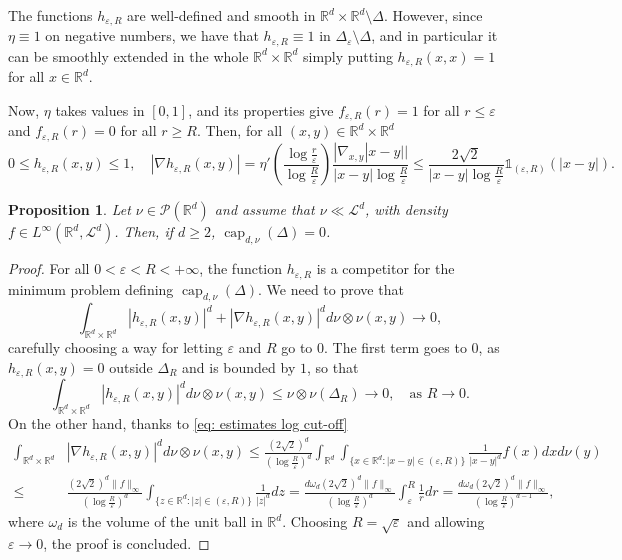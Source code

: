 \documentclass[10pt,leqno]{amsart}
\numberwithin{equation}{section}
\newtheorem{prop}[teorema]{Proposition}
\newcommand{\R}{\mathbb{R}}
\newcommand{\PP}{\mathcal{P}}
\begin{document}
The functions $h_{\varepsilon,R}$ are well-defined and smooth in $\R^d\times \R^d\setminus \Delta$. However, since $\eta\equiv 1$ on negative numbers, we have that $h_{\varepsilon,R} \equiv 1$ in $\Delta_{\varepsilon}\setminus \Delta$, and in particular it can be smoothly extended in the whole $\R^d\times\R^d$ simply putting $h_{\varepsilon,R}(x,x) = 1$ for all $x\in \R^d$.

Now, $\eta$ takes values in $[0,1]$, and its properties give $f_{\varepsilon,R}(r) = 1$ for all $r\leq \varepsilon$ and $f_{\varepsilon,R}(r) = 0$ for all $r\geq R$. Then, for all $(x,y)\in \R^d\times \R^d$ 
\begin{equation}\label{eq: estimates log cut-off}
    0 \leq h_{\varepsilon,R}(x,y) \leq 1, \quad |\nabla h_{\varepsilon,R}(x,y)| =\eta'\left( \frac{\log \frac{r}{\varepsilon}}{\log \frac{R}{\varepsilon}} \right) \frac{|\nabla_{x,y}|x-y||}{|x-y|\log \frac{R}{\varepsilon}} \leq \frac{2\sqrt{2}}{|x-y|\log \frac{R}{\varepsilon}} \mathds{1}_{(\varepsilon,R)}(|x-y|).
\end{equation}

\begin{prop}\label{prop: sharp capacity in R^d}
    Let $\nu\in \PP(\R^d)$ and assume that $\nu\ll\mathcal{L}^d$, with density $f \in L^\infty(\R^d,\mathcal{L}^d)$. Then, if $d\geq 2$, $\operatorname{cap}_{d,\nu}(\Delta) = 0$.
\end{prop}

\begin{proof}
    For all $0<\varepsilon<R<+\infty$, the function $h_{\varepsilon,R}$ is a competitor for the minimum problem defining $\operatorname{cap}_{d,\nu}(\Delta)$. We need to prove that 
    \[\int_{\R^d \times \R^d}|h_{\varepsilon,R}(x,y)|^d + |\nabla h_{\varepsilon,R}(x,y)|^d d\nu\otimes \nu(x,y) \to 0,\]
    carefully choosing a way for letting $\varepsilon$ and $R$ go to $0$. The first term goes to $0$, as $h_{\varepsilon,R}(x,y) = 0$ outside $\Delta_R$ and is bounded by $1$, so that
    \[\int_{\R^d \times \R^d} |h_{\varepsilon,R}(x,y)|^d d\nu\otimes \nu(x,y) \leq \nu\otimes\nu(\Delta_R) \to 0, \quad \text{as }R\to 0.\]
    On the other hand, thanks to \eqref{eq: estimates log cut-off} 
    \begin{align*}
        \int_{\R^d \times \R^d} & |\nabla h_{\varepsilon,R}(x,y)|^d d\nu\otimes \nu(x,y) \leq \frac{(2\sqrt{2})^d}{\left(\log \frac{R}{\varepsilon}\right)^d} \int_{\R^d} \int_{\{x \in \R^d : |x-y|\in (\varepsilon,R)\}} \frac{1}{|x-y|^d} f(x)dx d\nu(y)
        \\
        \leq & \frac{(2\sqrt{2})^d\|f\|_\infty}{\left(\log \frac{R}{\varepsilon}\right)^d} \int_{\{z\in \R^d : |z|\in (\varepsilon,R)\}} \frac{1}{|z|^d}dz = \frac{d\omega_d (2\sqrt{2})^d\|f\|_\infty}{\left(\log \frac{R}{\varepsilon}\right)^d}  \int_\varepsilon^R \frac{1}{r}dr = \frac{d\omega_d (2\sqrt{2})^d\|f\|_\infty}{\left(\log \frac{R}{\varepsilon}\right)^{d-1}}, 
    \end{align*}
    where $\omega_d$ is the volume of the unit ball in $\R^d$. Choosing $R=\sqrt{\varepsilon}$ and allowing $\varepsilon\to0$, the proof is concluded.
\end{proof}
\end{document}
